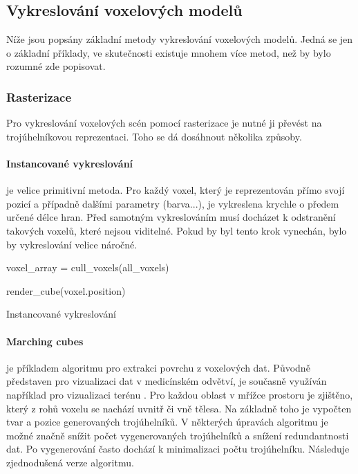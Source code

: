 \subsection{Vykreslování voxelových modelů}
Níže jsou popsány základní metody vykreslování voxelových modelů. Jedná se jen o základní příklady, ve skutečnosti existuje mnohem více metod, než by bylo rozumné zde popisovat.

\subsubsection{Rasterizace}
Pro vykreslování voxelových scén pomocí rasterizace je nutné ji převést na trojúhelníkovou reprezentaci. Toho se dá dosáhnout několika způsoby.

\paragraph{Instancované vykreslování} je velice primitivní metoda. Pro každý voxel, který je reprezentován přímo svojí pozicí a případně dalšími parametry (barva...), je vykreslena krychle o předem určené délce hran. Před samotným vykreslováním musí docházet k odstranění takových voxelů, které nejsou viditelné. Pokud by byl tento krok vynechán, bylo by vykreslování velice náročné. \cite{nousiainen_2019} 

\begin{center}
\begin{czechalgorithm}[H] \label{alg:instanced_cube}
    voxel\_array = cull\_voxels(all\_voxels)
    
     {
        render\_cube(voxel.position)
    }
 \caption{Instancované vykreslování}
\end{czechalgorithm}
\end{center}

\paragraph{Marching cubes \cite{marching_cubes}} je příkladem algoritmu pro extrakci povrchu z voxelových dat. Původně představen pro vizualizaci dat v medicínském odvětví, je současně využíván například pro vizualizaci terénu \cite{nguyen_2008}. Pro každou oblast v mřížce prostoru je zjištěno, který z rohů voxelu se nachází uvnitř či vně tělesa. Na základně toho je vypočten tvar a pozice generovaných trojúhelníků. V některých úpravách algoritmu je možné značně snížit počet vygenerovaných trojúhelníků a snížení redundantnosti dat. Po vygenerování často dochází k minimalizaci počtu trojúhelníku. Následuje zjednodušená verze algoritmu.

